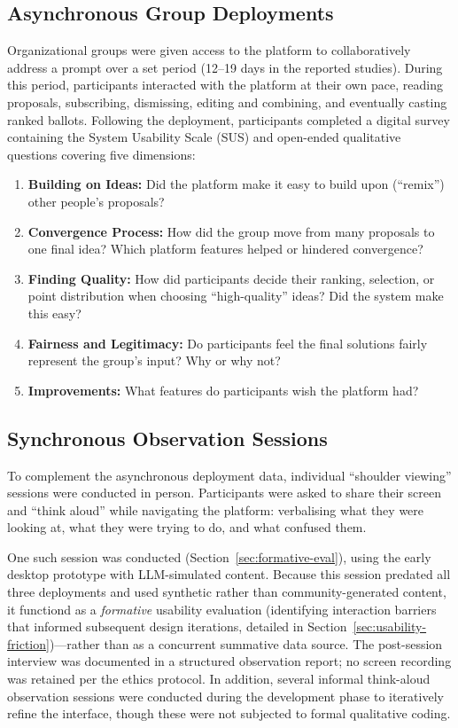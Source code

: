 \documentclass[a4paper, 12pt, twoside]{iviathesis}
\begin{document}
\subsection{Asynchronous Group Deployments}
\label{sec:method-a}
Organizational groups were given access to the platform to collaboratively address a prompt over a set period (12--19 days in the reported studies). During this period, participants interacted with the platform at their own pace, reading proposals, subscribing, dismissing, editing and combining, and eventually casting ranked ballots. Following the deployment, participants completed a digital survey containing the System Usability Scale (SUS) \cite{brooke1996sus} and open-ended qualitative questions covering five dimensions:
\begin{enumerate}
    \item \textbf{Building on Ideas:} Did the platform make it easy to build upon (``remix'') other people's proposals?
    \item \textbf{Convergence Process:} How did the group move from many proposals to one final idea? Which platform features helped or hindered convergence?
    \item \textbf{Finding Quality:} How did participants decide their ranking, selection, or point distribution when choosing ``high-quality'' ideas? Did the system make this easy?
    \item \textbf{Fairness and Legitimacy:} Do participants feel the final solutions fairly represent the group's input? Why or why not?
    \item \textbf{Improvements:} What features do participants wish the platform had?
\end{enumerate}

\subsection{Synchronous Observation Sessions}
\label{sec:method-b}
To complement the asynchronous deployment data, individual ``shoulder viewing'' sessions were conducted in person. Participants were asked to share their screen and ``think aloud'' \cite{ericsson1993protocol} while navigating the platform: verbalising what they were looking at, what they were trying to do, and what confused them.

One such session was conducted (Section~\ref{sec:formative-eval}), using the early desktop prototype with LLM-simulated content. Because this session predated all three deployments and used synthetic rather than community-generated content, it functiond as a \textit{formative} usability evaluation (identifying interaction barriers that informed subsequent design iterations, detailed in Section~\ref{sec:usability-friction})---rather than as a concurrent summative data source. The post-session interview was documented in a structured observation report; no screen recording was retained per the ethics protocol. In addition, several informal think-aloud observation sessions were conducted during the development phase to iteratively refine the interface, though these were not subjected to formal qualitative coding.
\end{document}

